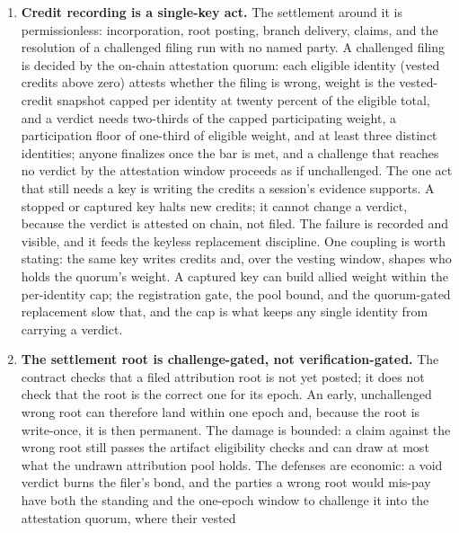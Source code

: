 \documentclass[11pt]{article}
\begin{document}
\begin{enumerate}
          That is the same corrupt-validator boundary the rest of the
          design carries.
    \item \textbf{Credit recording is a single-key act.} The
          settlement around it is permissionless: incorporation, root
          posting, branch delivery, claims, and the resolution of a
          challenged filing run with no named party. A challenged filing
          is decided by the on-chain attestation quorum: each eligible
          identity (vested credits above zero) attests whether the filing
          is wrong, weight is the vested-credit snapshot capped per
          identity at twenty percent of the eligible total, and a verdict
          needs two-thirds of the capped participating weight, a
          participation floor of one-third of eligible weight, and at
          least three distinct identities; anyone finalizes once the bar
          is met, and a challenge that reaches no verdict by the
          attestation window proceeds as if unchallenged. The one act
          that still needs a key is writing the credits a session's
          evidence supports. A stopped or captured key halts new credits;
          it cannot change a verdict, because the verdict is attested on
          chain, not filed. The failure is recorded and visible, and it
          feeds the keyless replacement discipline. One coupling is worth
          stating: the same key writes credits and, over the vesting
          window, shapes who holds the quorum's weight. A captured key can
          build allied weight within the per-identity cap; the registration
          gate, the pool bound, and the quorum-gated replacement slow that,
          and the cap is what keeps any single identity from carrying a
          verdict.
    \item \textbf{The settlement root is challenge-gated, not
              verification-gated.} The contract checks that a filed
          attribution root is not yet posted; it does not check that the
          root is the correct one for its epoch. An early, unchallenged
          wrong root can therefore land within one epoch and, because the
          root is write-once, it is then permanent. The damage is bounded:
          a claim against the wrong root still passes the artifact
          eligibility checks and can draw at most what the undrawn
          attribution pool holds. The defenses are economic: a void
          verdict burns the filer's bond, and the parties a wrong root
          would mis-pay have both the standing and the one-epoch window to
          challenge it into the attestation quorum, where their vested

\end{enumerate}
\end{document}
